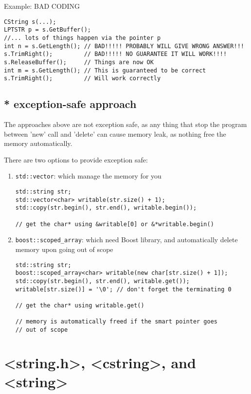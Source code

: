 Example: BAD CODING
\begin{verbatim}
CString s(...);
LPTSTR p = s.GetBuffer();
//... lots of things happen via the pointer p
int n = s.GetLength(); // BAD!!!!! PROBABLY WILL GIVE WRONG ANSWER!!!
s.TrimRight();         // BAD!!!!! NO GUARANTEE IT WILL WORK!!!!
s.ReleaseBuffer();     // Things are now OK
int m = s.GetLength(); // This is guaranteed to be correct
s.TrimRight();         // Will work correctly
\end{verbatim}

\subsection{* exception-safe approach}

The approaches above are not exception safe, as any thing that stop the
program between 'new' call and 'delete' can cause memory leak, as nothing free the
memory automatically. 

There are two options to provide exception safe:
\begin{enumerate}
  \item \verb!std::vector!: which manage the memory for you
  \begin{verbatim}
std::string str;
std::vector<char> writable(str.size() + 1);
std::copy(str.begin(), str.end(), writable.begin());

// get the char* using &writable[0] or &*writable.begin()
  \end{verbatim}
  
  \item \verb!boost::scoped_array!: which need Boost library, and automatically
  delete memory upon going out of scope
  \begin{verbatim}
std::string str;
boost::scoped_array<char> writable(new char[str.size() + 1]);
std::copy(str.begin(), str.end(), writable.get());
writable[str.size()] = '\0'; // don't forget the terminating 0

// get the char* using writable.get()

// memory is automatically freed if the smart pointer goes 
// out of scope
  \end{verbatim}
\end{enumerate}


\section{<string.h>, <cstring>, and <string>}
\label{sec:header-file-comparison-string}

